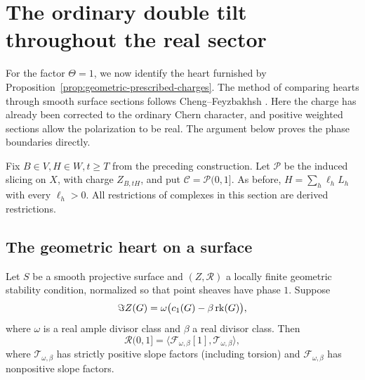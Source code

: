 \section{The ordinary double tilt throughout the real sector}
\label{sec:heart}

For the factor $\Theta=1$, we now identify the heart furnished by
Proposition~\ref{prop:geometric-prescribed-charges}.  The method of comparing
hearts through smooth surface sections follows Cheng--Feyzbakhsh
\cite[Section~3]{ChengFeyzbakhsh2026}.  Here the charge has already been
corrected to the ordinary Chern character, and positive weighted sections
allow the polarization to be real.  The argument below proves the phase
boundaries directly.

Fix $B\in V,H\in W,t\ge T$ from the preceding construction.  Let
$\mathcal P$ be the induced slicing on $X$, with charge $Z_{B,tH}$, and put
$\mathcal C=\mathcal P(0,1]$.  As before,
$H=\sum_h\ell_hL_h$ with every $\ell_h>0$.  All restrictions of complexes
in this section are derived restrictions.

\subsection{The geometric heart on a surface}

\begin{lemma}\label{lem:surface-geometric-heart}
Let $S$ be a smooth projective surface and $(Z,\mathcal R)$ a locally finite
geometric stability condition, normalized so that point sheaves have phase
$1$.  Suppose
\[
 \Im Z(G)=\omega\bigl(c_1(G)-\beta\operatorname{rk}(G)\bigr),
\]
where $\omega$ is a real ample divisor class and $\beta$ a real divisor
class.  Then
\[
 \mathcal R(0,1]=\langle\mathcal F_{\omega,\beta}[1],
                              \mathcal T_{\omega,\beta}\rangle,
\]
where $\mathcal T_{\omega,\beta}$ has strictly positive slope factors
(including torsion) and $\mathcal F_{\omega,\beta}$ has nonpositive
slope factors.
\end{lemma}

